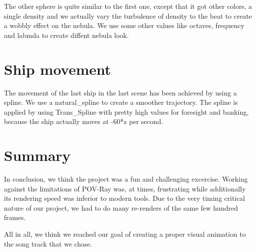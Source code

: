 \documentclass[a4paper, 12pt]{scrartcl}
\begin{document}
    The other sphere is quite similar to the first one, except that it got other colors, a single density and we actually vary the turbulence of density to the beat to create a wobbly effect on the nebula. 
    We use some other values like octaves, frequency and labmda to create diffent nebula look.

    \section{Ship movement}
    \label{sec:spline}

    The movement of the last ship in the last scene has been achieved by using a spline. We
    use a natural\_spline to create a smoother trajectory. The spline is applied by using
    Trans\_Spline with pretty high values for foresight and banking, because the ship actually
    moves at -60*z per second.

    \section{Summary}

    In conclusion, we think the project was a fun and challenging excercise. Working against the
    limitations of POV-Ray was, at times, frustrating while additionally its rendering speed was
    inferior to modern tools. Due to the very timing critical nature of our project, we had to do
    many re-renders of the same few hundred frames.

    All in all, we think we reached our goal of creating a proper visual animation to the song
    track that we chose.
\end{document}
